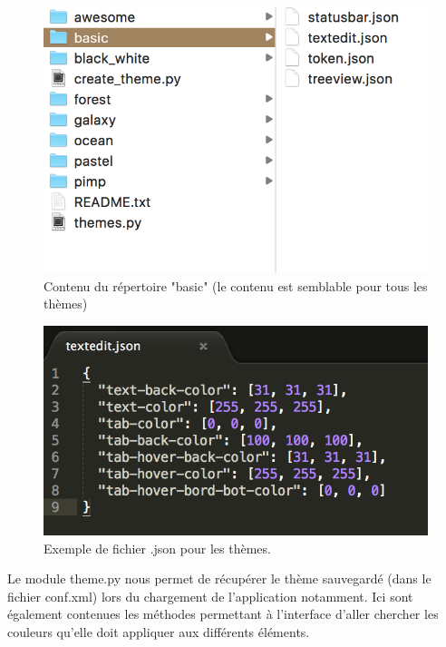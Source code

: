 \documentclass[a4paper,12pt]{article}
\begin{document}
			\begin{figure}[h!]
				\begin{center}
					\includegraphics[scale=0.7]{images/imgs_themes/basic_json}
					\caption{Contenu du répertoire "basic" (le contenu est semblable pour tous les thèmes)}
				\end{center}
			\end{figure}
			\begin{figure}[h!]
				\begin{center}
					\includegraphics[scale=0.7]{images/imgs_themes/exemple_json}
					\caption{Exemple de fichier .json pour les thèmes.}
				\end{center}
			\end{figure}
			
			Le module theme.py nous permet de récupérer le thème sauvegardé (dans le fichier conf.xml) lors du chargement de l'application notamment. Ici sont également contenues les méthodes permettant à l'interface d'aller chercher les couleurs qu'elle doit appliquer aux différents éléments.\\
			
\end{document}
